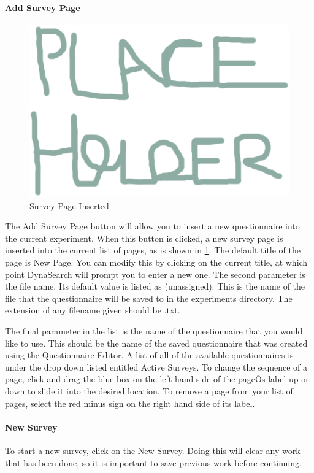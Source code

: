 \documentclass[article]{ij4uq}              %
\begin{document}
\paragraph{Add Survey Page}

\begin{figure}[h!]
 \centering
 \includegraphics[width=5.0in]{figures/place.eps}
 \caption{Survey Page Inserted}
 \label{fig:surveyInsert}
\end{figure}
\FloatBarrier

The Add Survey Page button will allow you to insert a new questionnaire into the current experiment. When this button is clicked, a new survey page is inserted into the current list of pages, as is shown in \ref{fig:surveyInsert}. The default title of the page is New Page. You can modify this by clicking on the current title, at which point DynaSearch will prompt you to enter a new one. The second parameter is the file name. Its default value is listed as (unassigned). This is the name of the file that the questionnaire will be saved to in the experiments directory. The extension of any filename given should be .txt.

The final parameter in the list is the name of the questionnaire that you would like to use. This should be the name of the saved questionnaire that was created using the Questionnaire Editor. A list of all of the available questionnaires is under the drop down listed entitled Active Surveys. 
To change the sequence of a page, click and drag the blue box on the left hand side of the pageÕs label up or down to slide it into the desired location. To remove a page from your list of pages, select the red minus sign on the right hand side of its label.

\paragraph{New Survey}
To start a new survey, click on the New Survey. Doing this will clear any work that has been done, so it is important to save previous work before continuing.
\end{document}
